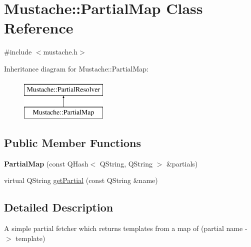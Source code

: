\hypertarget{classMustache_1_1PartialMap}{\section{Mustache\-:\-:Partial\-Map Class Reference}
\label{classMustache_1_1PartialMap}
}


{\ttfamily \#include $<$mustache.\-h$>$}

Inheritance diagram for Mustache\-:\-:Partial\-Map\-:\begin{figure}[H]
\begin{center}
\leavevmode
\includegraphics[height=2.000000cm]{dc/d1a/classMustache_1_1PartialMap}
\end{center}
\end{figure}
\subsection*{Public Member Functions}
\begin{DoxyCompactItemize}
\item 
\hypertarget{classMustache_1_1PartialMap_a6b03a962390f637625af4b194b0504b8}{{\bfseries Partial\-Map} (const Q\-Hash$<$ Q\-String, Q\-String $>$ \&partials)}\label{classMustache_1_1PartialMap_a6b03a962390f637625af4b194b0504b8}

\item 
virtual Q\-String \hyperlink{classMustache_1_1PartialMap_a676a6f9a77cdd53e91b18216733b2781}{get\-Partial} (const Q\-String \&name)
\end{DoxyCompactItemize}


\subsection{Detailed Description}
A simple partial fetcher which returns templates from a map of (partial name -\/$>$ template) 

